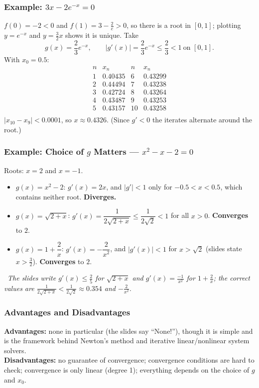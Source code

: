 \documentclass[hidelinks]{article}
\newcommand{\callout}[1]{\par\smallskip\noindent{\color{capri}$\blacktriangleright$}\ \textit{#1}\par\smallskip}
\newcommand{\abs}[1]{\left|#1\right|}
\begin{document}
\subsubsection{Example: $3x-2e^{-x}=0$}

$f(0)=-2<0$ and $f(1)=3-\frac2e>0$, so there is a root in $[0,1]$; plotting $y=e^{-x}$ and $y=\frac32x$ shows it is unique. Take
\[
g(x)=\frac23e^{-x},\qquad \abs{g'(x)}=\frac23e^{-x}\le\frac23<1\ \text{on }[0,1].
\]
With $x_0=0.5$:
\[
\begin{array}{cc|cc}
n & x_n & n & x_n\\ \hline
1 & 0.40435 & 6 & 0.43299\\
2 & 0.44494 & 7 & 0.43238\\
3 & 0.42724 & 8 & 0.43264\\
4 & 0.43487 & 9 & 0.43253\\
5 & 0.43157 & 10 & 0.43258\\
\end{array}
\]
$\abs{x_{10}-x_9}<0.0001$, so $x\approx0.4326$. (Since $g'<0$ the iterates alternate around the root.)

\subsubsection{Example: Choice of $g$ Matters --- $x^2-x-2=0$}

Roots: $x=2$ and $x=-1$.
\begin{itemize}
    \item $g(x)=x^2-2$: $g'(x)=2x$, and $\abs{g'}<1$ only for $-0.5<x<0.5$, which contains neither root. \textbf{Diverges.}
    \item $g(x)=\sqrt{2+x}$: $g'(x)=\dfrac{1}{2\sqrt{2+x}}\le\dfrac{1}{2\sqrt2}<1$ for all $x>0$. \textbf{Converges} to $2$.
    \item $g(x)=1+\dfrac2x$: $g'(x)=-\dfrac2{x^2}$, and $\abs{g'(x)}<1$ for $x>\sqrt2$ (slides state $x>\tfrac32$). \textbf{Converges} to $2$.
\end{itemize}
\callout{The slides write $g'(x)\le\frac25$ for $\sqrt{2+x}$ and $g'(x)=\frac{-1}{x^2}$ for $1+\frac2x$; the correct values are $\frac{1}{2\sqrt{2+x}}<\frac{1}{2\sqrt2}\approx0.354$ and $-\frac{2}{x^2}$.}

\subsubsection{Advantages and Disadvantages}

\textbf{Advantages:} none in particular (the slides say ``None!''), though it is simple and is the framework behind Newton's method and iterative linear/nonlinear system solvers.\\
\textbf{Disadvantages:} no guarantee of convergence; convergence conditions are hard to check; convergence is only linear (degree 1); everything depends on the choice of $g$ and $x_0$.
\end{document}
